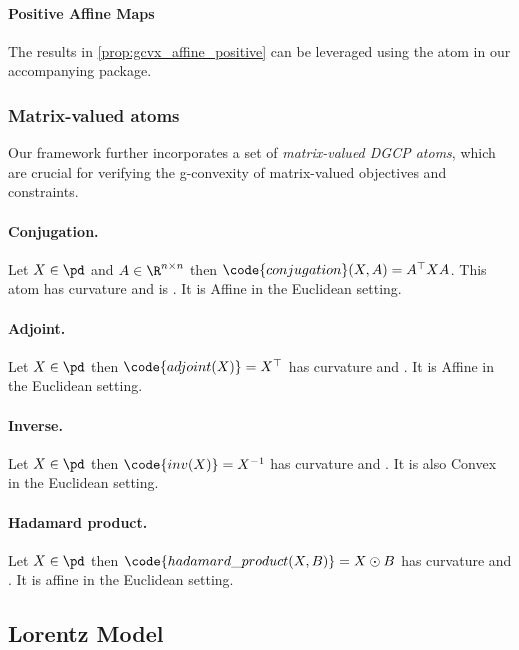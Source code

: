 \documentclass[twoside,11pt]{article}
\begin{document}
\paragraph{Positive Affine Maps}

The results in \ref{prop:gcvx_affine_positive} can be leveraged using the  atom in our accompanying package.

\subsubsection{Matrix-valued atoms}
Our framework further incorporates a set of \emph{matrix-valued DGCP atoms}, which are crucial for verifying the g-convexity of matrix-valued objectives and constraints.

\paragraph{Conjugation.} Let $X \in \pd$ and $A \in \R^{n \times n}$ then $\code{conjugation}(X, A) = A^\top X A$.
This atom has  curvature and is . It is Affine in the Euclidean setting.

\paragraph{Adjoint.} Let $X \in \pd$ then $\code{adjoint(X)} = X^\top$ has  curvature and . It is Affine in the Euclidean setting.

\paragraph{Inverse.} Let $X \in \pd$ then $\code{inv(X)} = X^{-1}$ has  curvature and . It is also Convex in the Euclidean setting.

\paragraph{Hadamard product.} Let $X \in \pd$ then $\code{hadamard\_product(X, B)} = X \odot B$ has  curvature and . It is affine in the Euclidean setting.


\subsection{Lorentz Model}\label{sec:Lorentz_model}
\end{document}
